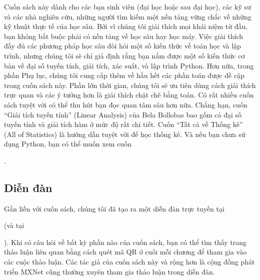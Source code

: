 \documentclass[letterpaper,11pt,english]{sphinxmanual}
\begin{document}
Cuốn sách này dành cho các bạn sinh viên (đại học hoặc sau đại học), các
kỹ sư và các nhà nghiên cứu, những người tìm kiếm một nền tảng vững chắc
về những kỹ thuật thực tế của học sâu. Bởi vì chúng tôi giải thích mọi
khái niệm từ đầu, bạn không bắt buộc phải có nền tảng về học sâu hay học
máy. Việc giải thích đầy đủ các phương pháp học sâu đòi hỏi một số kiến
thức về toán học và lập trình, nhưng chúng tôi sẽ chỉ giả định rằng bạn
nắm được một số kiến thức cơ bản về đại số tuyến tính, giải tích, xác
suất, và lập trình Python. Hơn nữa, trong phần Phụ lục, chúng tôi cung
cấp thêm về hầu hết các phần toán được đề cập trong cuốn sách này. Phần
lớn thời gian, chúng tôi sẽ ưu tiên dùng cách giải thích trực quan và
các ý tưởng hơn là giải thích chặt chẽ bằng toán. Có rất nhiều cuốn sách
tuyệt vời có thể thu hút bạn đọc quan tâm sâu hơn nữa. Chẳng hạn, cuốn
“Giải tích tuyến tính” (Linear Analysis) của Bela Bollobas
 bao gồm cả đại số tuyến tính và giải tích hàm ở
mức độ rất chi tiết. Cuốn “Tất cả về Thống kê” (All of Statistics)
 là hướng dẫn tuyệt vời để học thống kê. Và nếu
bạn chưa sử dụng Python, bạn có thể muốn xem cuốn %
\begin{footnote}[20]\sphinxAtStartFootnote
{}
%
\end{footnote}.




\subsection{Diễn đàn}
\label{\detokenize{chapter_preface/index_vn:dien-dan}}


Gắn liền với cuốn sách, chúng tôi đã tạo ra một diễn đàn trực tuyến tại
%
\begin{footnote}[21]\sphinxAtStartFootnote
{}
%
\end{footnote} (và tại %
\begin{footnote}[22]\sphinxAtStartFootnote
{}
%
\end{footnote}). Khi có
câu hỏi về bất kỳ phần nào của cuốn sách, bạn có thể tìm thấy trang thảo
luận liên quan bằng cách quét mã QR ở cuối mỗi chương để tham gia vào
các cuộc thảo luận. Các tác giả của cuốn sách này và rộng hơn là cộng
đồng phát triển MXNet cũng thường xuyên tham gia thảo luận trong diễn
đàn.
\end{document}
